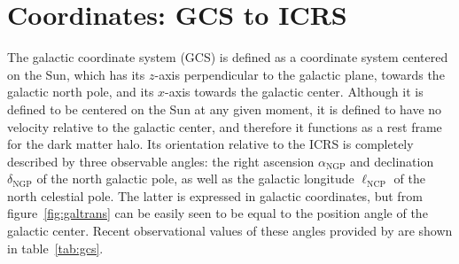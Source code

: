 \documentclass[b5paper, 10pt, twoside]{book}
\begin{document}
\section{Coordinates: GCS to ICRS}

The galactic coordinate system (GCS) is defined as a coordinate system centered on the Sun, which has its $z$-axis perpendicular to the galactic plane, towards the galactic north pole, and its $x$-axis towards the galactic center. Although it is defined to be centered on the Sun at any given moment, it is defined to have no velocity relative to the galactic center, and therefore it functions as a rest frame for the dark matter halo. Its orientation relative to the ICRS is completely described by three observable angles: the right ascension $\alpha_\text{NGP}$ and declination $\delta_\text{NGP}$ of the north galactic pole, as well as the galactic longitude $\ell_\text{NCP}$ of the north celestial pole. The latter is expressed in galactic coordinates, but from figure~\ref{fig:galtrans} can be easily seen to be equal to the position angle of the galactic center. Recent observational values of these angles provided by \cite{KarimMamajek2017} are shown in table~\ref{tab:gcs}.
\end{document}
